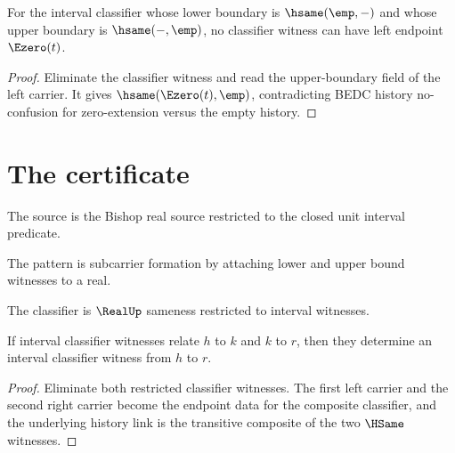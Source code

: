 \begin{theorem}
\label{thm:interval-empty-boundary-e0-left-absurd}
For the interval classifier whose lower boundary is \(\hsame(\emp,-)\) and
whose upper boundary is \(\hsame(-,\emp)\), no classifier witness can have
left endpoint \(\Ezero(t)\).
\end{theorem}
\begin{proof}
Eliminate the classifier witness and read the upper-boundary field of the left
carrier. It gives \(\hsame(\Ezero(t),\emp)\), contradicting BEDC history
no-confusion for zero-extension versus the empty history.
\end{proof}

\section{The certificate}

\begin{definition}
\label{def:interval-source-specification}
The source is the Bishop real source restricted to the closed unit interval predicate.
\end{definition}

\begin{definition}
\label{def:interval-pattern-specification}
The pattern is subcarrier formation by attaching lower and upper bound witnesses to a real.
\end{definition}

\begin{definition}
\label{def:interval-classifier-specification}
The classifier is \(\RealUp\) sameness restricted to interval witnesses.
\end{definition}

\begin{theorem}
\label{thm:interval-classifier-transitivity}
If interval classifier witnesses relate \(h\) to \(k\) and \(k\) to \(r\), then
they determine an interval classifier witness from \(h\) to \(r\).
\end{theorem}
\begin{proof}
Eliminate both restricted classifier witnesses. The first left carrier and the
second right carrier become the endpoint data for the composite classifier, and
the underlying history link is the transitive composite of the two \(\HSame\)
witnesses.
\end{proof}

